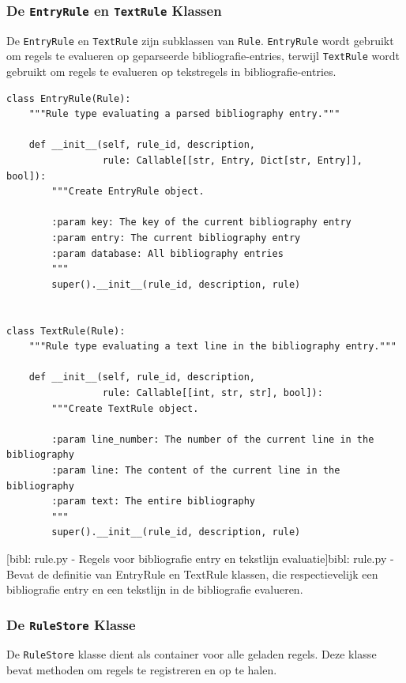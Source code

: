 \subsubsection{De \texttt{EntryRule} en \texttt{TextRule} Klassen}

De \texttt{EntryRule} en \texttt{TextRule} zijn subklassen van \texttt{Rule}. \texttt{EntryRule} wordt gebruikt om regels te evalueren op geparseerde bibliografie-entries, terwijl \texttt{TextRule} wordt gebruikt om regels te evalueren op tekstregels in bibliografie-entries.

\begin{verbatim}
class EntryRule(Rule):
    """Rule type evaluating a parsed bibliography entry."""

    def __init__(self, rule_id, description,
                 rule: Callable[[str, Entry, Dict[str, Entry]], bool]):
        """Create EntryRule object.

        :param key: The key of the current bibliography entry
        :param entry: The current bibliography entry
        :param database: All bibliography entries
        """
        super().__init__(rule_id, description, rule)


class TextRule(Rule):
    """Rule type evaluating a text line in the bibliography entry."""

    def __init__(self, rule_id, description,
                 rule: Callable[[int, str, str], bool]):
        """Create TextRule object.

        :param line_number: The number of the current line in the bibliography
        :param line: The content of the current line in the bibliography
        :param text: The entire bibliography
        """
        super().__init__(rule_id, description, rule)
\end{verbatim}
[bibl: rule.py - Regels voor bibliografie entry en tekstlijn evaluatie]{bibl: rule.py - Bevat de definitie van EntryRule en TextRule klassen, die respectievelijk een bibliografie entry en een tekstlijn in de bibliografie evalueren. \label{lst:bibl_rule_types_init}}


\subsubsection{De \texttt{RuleStore} Klasse}

De \texttt{RuleStore} klasse dient als container voor alle geladen regels. Deze klasse bevat methoden om regels te registreren en op te halen.

